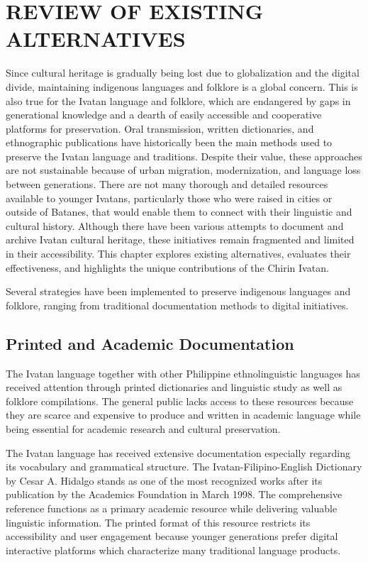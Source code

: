 \section{REVIEW OF EXISTING ALTERNATIVES}

                Since cultural heritage is gradually being lost due to globalization and the digital divide, maintaining indigenous languages and folklore is a global concern. This is also true for the Ivatan language and folklore, which are endangered by gaps in generational knowledge and a dearth of easily accessible and cooperative platforms for preservation. Oral transmission, written dictionaries, and ethnographic publications have historically been the main methods used to preserve the Ivatan language and traditions. Despite their value, these approaches are not sustainable because of urban migration, modernization, and language loss between generations. There are not many thorough and detailed resources available to younger Ivatans, particularly those who were raised in cities or outside of Batanes, that would enable them to connect with their linguistic and cultural history. Although there have been various attempts to document and archive Ivatan cultural heritage, these initiatives remain fragmented and limited in their accessibility. This chapter explores existing alternatives, evaluates their effectiveness, and highlights the unique contributions of the Chirin Ivatan.
                
                Several strategies have been implemented to preserve indigenous languages and folklore, ranging from traditional documentation methods to digital initiatives. 

                \subsection {Printed and Academic Documentation}
                The Ivatan language together with other Philippine ethnolinguistic languages has received attention through printed dictionaries  and linguistic study as well as folklore compilations. The general public lacks access to these resources because they  are scarce and expensive to produce and written in academic language while being essential for academic research and cultural preservation.

                The Ivatan language has received extensive documentation especially regarding its vocabulary and grammatical structure. The  Ivatan-Filipino-English Dictionary by Cesar A. Hidalgo stands as one of the  most recognized works after its publication by the Academics Foundation in March 1998. The comprehensive reference  functions as a primary academic resource while delivering valuable linguistic information. The printed format of this resource restricts  its accessibility and user engagement because younger generations prefer digital interactive platforms which characterize many traditional language products.

